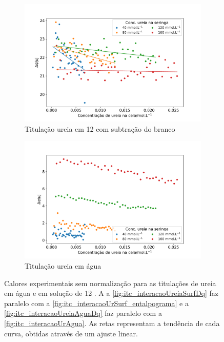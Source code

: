 \begin{figure}[h]
	\begin{subfigure}{0.5\textwidth}
		\centering
		\includegraphics[width=\textwidth]{imagens/itc/interacao_ureia_surf_dq}
		\caption{Titulação ureia em \TTAB{} 12 \mM{} com subtração do branco}
		\label{fig:itc_interacaoUreiaSurfDq}
	\end{subfigure} %
	\begin{subfigure}{0.5\textwidth}
		\centering
		\includegraphics[width=\textwidth]{imagens/itc/interacao_branco_dq}
		\caption{Titulação ureia em água}
		\label{fig:itc_interacaoUreiaAguaDq}
	\end{subfigure} 

	\caption{Calores experimentais sem normalização para as titulações de ureia em água e em solução de \TTAB{} 12 \mM. A a \autoref{fig:itc_interacaoUreiaSurfDq} faz paralelo com a \autoref{fig:itc_interacaoUrSurf_entalpograma} e a \autoref{fig:itc_interacaoUreiaAguaDq} faz paralelo com a \autoref{fig:itc_interacaoUrAgua}. As retas representam a tendência de cada curva, obtidas através de um ajuste linear.}
	\label{fig:itc_comparativo_tit_ureia_agua_ureia_ttab}
\end{figure}
	
